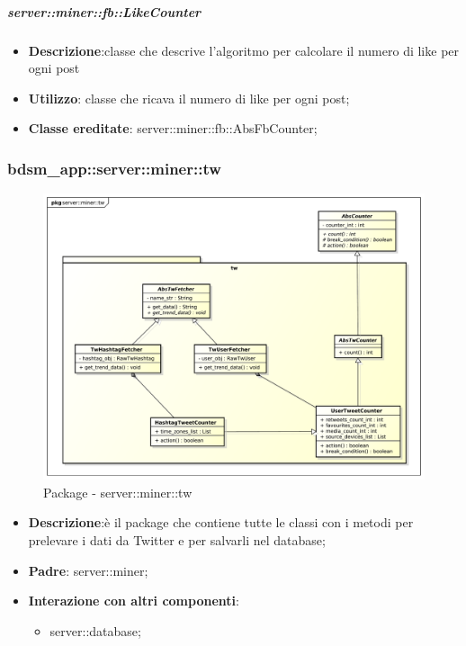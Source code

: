 	\subparagraph{server::miner::fb::LikeCounter} %
		\label{subp:server_miner_fb_LikeCounter}
			\begin{itemize}
					\item \textbf{Descrizione}:classe che descrive l'algoritmo per calcolare il numero di like per ogni post
				\item \textbf{Utilizzo}: classe che ricava il numero di like per ogni post;
				\item \textbf{Classe ereditate}: server::miner::fb::AbsFbCounter;
			\end{itemize}

\subsubsection{bdsm\_app::server::miner::tw} %
\label{ssub:bdsm_app_server_miner_tw}
\begin{figure}[htbp]
	\centering
	\centerline{\includegraphics[scale=0.4]{./images/server/miner_tw.pdf}}
	\caption{Package - server::miner::tw}
\end{figure}

\begin{itemize}
  \item \textbf{Descrizione}:è il package che contiene tutte le classi con i metodi per prelevare
i dati da Twitter e per salvarli nel database;
  \item \textbf{Padre}: server::miner;
  \item \textbf{Interazione con altri componenti}:
  	\begin{itemize}
  		\item server::database;
  	\end{itemize}
\end{itemize}

